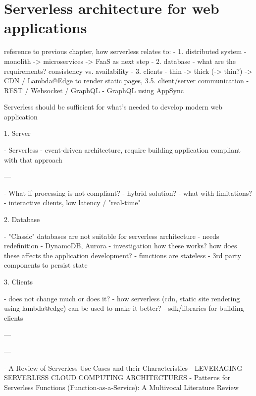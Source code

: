 \chapter{Serverless architecture for web applications}


reference to previous chapter, how serverless relates to:
- 1. distributed system - monolith -> microservices -> FaaS as next step
- 2. database - what are the requirements? consistency vs. availability
- 3. clients - thin -> thick (-> thin?) -> CDN / Lambda@Edge to render static pages, 3.5. client/server communication - REST / Websocket / GraphQL - GraphQL using AppSync

Serverless should be sufficient for what's needed to develop modern web application 

1. Server

- Serverless - event-driven architecture, require building application compliant with that approach

---

- What if processing is not compliant? - hybrid solution?
- what with limitations? - interactive clients, low latency / "real-time" 

2. Database

- "Classic" databases are not suitable for serverless architecture - needs redefinition - DynamoDB, Aurora - investigation how these works? how does these affects the application development?
- functions are stateless - 3rd party components to persist state

3. Clients 

- does not change much or does it?
- how serverless (cdn, static site rendering using lambda@edge) can be used to make it better?
- sdk/libraries for building clients

---

---

- A Review of Serverless Use Cases and their Characteristics
- LEVERAGING SERVERLESS CLOUD COMPUTING ARCHITECTURES
- Patterns for Serverless Functions (Function-as-a-Service): A Multivocal Literature Review

